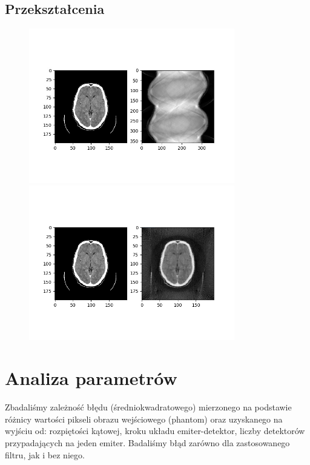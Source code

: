 \documentclass{article}
\begin{document}
\subsection{Przekształcenia}
\begin{figure}[H]
\begin{center}
\includegraphics[width=0.8\textwidth]{./brain/sinogram.jpg}
\includegraphics[width=0.8\textwidth]{./brain/reconstructedImg2.png}
\end{center}
\end{figure}

\section{Analiza parametrów}

Zbadaliśmy zależność błędu (średniokwadratowego) mierzonego na podstawie różnicy wartości pikseli obrazu wejściowego (phantom) oraz uzyskanego na wyjściu od: rozpiętości kątowej, kroku układu emiter-detektor, liczby detektorów przypadających na jeden emiter. Badaliśmy błąd zarówno dla zastosowanego filtru, jak i bez niego.
\end{document}
